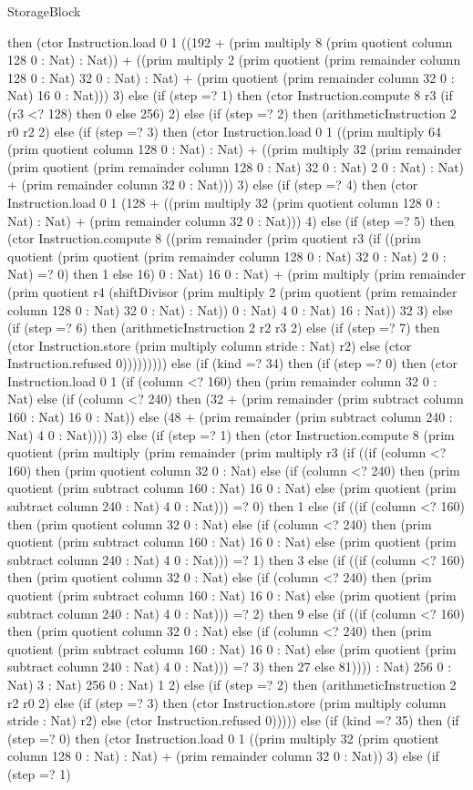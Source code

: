 \begin{lexlean}{StorageBlock}
\begin{semanticmodule}
{then (ctor Instruction.load 0 1 ((192 + (prim multiply 8 (prim quotient column 128 0 : Nat) : Nat)) + ((prim multiply 2 (prim quotient (prim remainder column 128 0 : Nat) 32 0 : Nat) : Nat) + (prim quotient (prim remainder column 32 0 : Nat) 16 0 : Nat))) 3) else (if (step =? 1) then (ctor Instruction.compute 8 r3 (if (r3 <? 128) then 0 else 256) 2) else (if (step =? 2) then (arithmeticInstruction 2 r0 r2 2) else (if (step =? 3) then (ctor Instruction.load 0 1 ((prim multiply 64 (prim quotient column 128 0 : Nat) : Nat) + ((prim multiply 32 (prim remainder (prim quotient (prim remainder column 128 0 : Nat) 32 0 : Nat) 2 0 : Nat) : Nat) + (prim remainder column 32 0 : Nat))) 3) else (if (step =? 4) then (ctor Instruction.load 0 1 (128 + ((prim multiply 32 (prim quotient column 128 0 : Nat) : Nat) + (prim remainder column 32 0 : Nat))) 4) else (if (step =? 5) then (ctor Instruction.compute 8 ((prim remainder (prim quotient r3 (if ((prim quotient (prim quotient (prim remainder column 128 0 : Nat) 32 0 : Nat) 2 0 : Nat) =? 0) then 1 else 16) 0 : Nat) 16 0 : Nat) + (prim multiply (prim remainder (prim quotient r4 (shiftDivisor (prim multiply 2 (prim quotient (prim remainder column 128 0 : Nat) 32 0 : Nat) : Nat)) 0 : Nat) 4 0 : Nat) 16 : Nat)) 32 3) else (if (step =? 6) then (arithmeticInstruction 2 r2 r3 2) else (if (step =? 7) then (ctor Instruction.store (prim multiply column stride : Nat) r2) else (ctor Instruction.refused 0))))))))) else (if (kind =? 34) then (if (step =? 0) then (ctor Instruction.load 0 1 (if (column <? 160) then (prim remainder column 32 0 : Nat) else (if (column <? 240) then (32 + (prim remainder (prim subtract column 160 : Nat) 16 0 : Nat)) else (48 + (prim remainder (prim subtract column 240 : Nat) 4 0 : Nat)))) 3) else (if (step =? 1) then (ctor Instruction.compute 8 (prim quotient (prim multiply (prim remainder (prim multiply r3 (if ((if (column <? 160) then (prim quotient column 32 0 : Nat) else (if (column <? 240) then (prim quotient (prim subtract column 160 : Nat) 16 0 : Nat) else (prim quotient (prim subtract column 240 : Nat) 4 0 : Nat))) =? 0) then 1 else (if ((if (column <? 160) then (prim quotient column 32 0 : Nat) else (if (column <? 240) then (prim quotient (prim subtract column 160 : Nat) 16 0 : Nat) else (prim quotient (prim subtract column 240 : Nat) 4 0 : Nat))) =? 1) then 3 else (if ((if (column <? 160) then (prim quotient column 32 0 : Nat) else (if (column <? 240) then (prim quotient (prim subtract column 160 : Nat) 16 0 : Nat) else (prim quotient (prim subtract column 240 : Nat) 4 0 : Nat))) =? 2) then 9 else (if ((if (column <? 160) then (prim quotient column 32 0 : Nat) else (if (column <? 240) then (prim quotient (prim subtract column 160 : Nat) 16 0 : Nat) else (prim quotient (prim subtract column 240 : Nat) 4 0 : Nat))) =? 3) then 27 else 81)))) : Nat) 256 0 : Nat) 3 : Nat) 256 0 : Nat) 1 2) else (if (step =? 2) then (arithmeticInstruction 2 r2 r0 2) else (if (step =? 3) then (ctor Instruction.store (prim multiply column stride : Nat) r2) else (ctor Instruction.refused 0))))) else (if (kind =? 35) then (if (step =? 0) then (ctor Instruction.load 0 1 ((prim multiply 32 (prim quotient column 128 0 : Nat) : Nat) + (prim remainder column 32 0 : Nat)) 3) else (if (step =? 1) }
\end{semanticmodule}
\end{lexlean}
